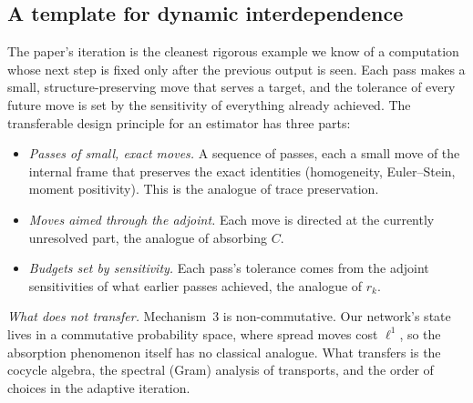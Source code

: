 \subsection{A template for dynamic interdependence}
The paper's iteration is the cleanest rigorous example we know of a computation whose next step is fixed only after the previous output
is seen. Each pass makes a small, structure-preserving move that serves a target, and the tolerance of every future move is set by the
sensitivity of everything already achieved. The transferable design principle for an estimator has three parts:
\begin{itemize}[leftmargin=*]
\item \emph{Passes of small, exact moves.} A sequence of passes, each a small move of the internal frame that preserves the exact identities
(homogeneity, Euler--Stein, moment positivity). This is the analogue of trace preservation.
\item \emph{Moves aimed through the adjoint.} Each move is directed at the currently unresolved part, the analogue of absorbing $C$.
\item \emph{Budgets set by sensitivity.} Each pass's tolerance comes from the adjoint sensitivities of what earlier passes achieved, the analogue
of $r_k$.
\end{itemize}

\emph{What does not transfer.} Mechanism~3 is non-commutative. Our network's state lives in a commutative probability space, where spread moves
cost $\ell^1$, so the absorption phenomenon itself has no classical analogue. What transfers is the cocycle algebra, the spectral (Gram)
analysis of transports, and the order of choices in the adaptive iteration.
